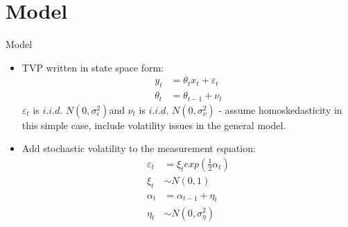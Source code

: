 \documentclass[dvipsnames,mathserif]{beamer}
\begin{document}
{\section{Model}
\begin{frame}{Model}
    \begin{itemize}
        \item TVP written in state space form:\\
            \begin{align}
            y_t &= \theta_tx_t + \varepsilon_t\\
            \theta_t &= \theta_{t-1} + \nu_t
            \end{align}
        $\varepsilon_t$ is $i.i.d.$ $N(0,\sigma_\epsilon^2) $and $\nu_t$ is $i.i.d.$ $N(0,\sigma_\nu^2)$ - assume homoskedasticity in this simple case, include volatility issues in the general model.\\
        \item Add stochastic volatility to the measurement equation:\\
            \begin{align*}
            \varepsilon_t &= \xi_t exp\left(\frac{1}{2}\alpha_t\right)\\
            \xi_t &\sim N(0,1)\\
            \alpha_t &= \alpha_{t-1} + \eta_t\\
            \eta_t &\sim N(0, \sigma_\eta^2)
            \end{align*}
        
    \end{itemize}


\end{frame}}
\end{document}
